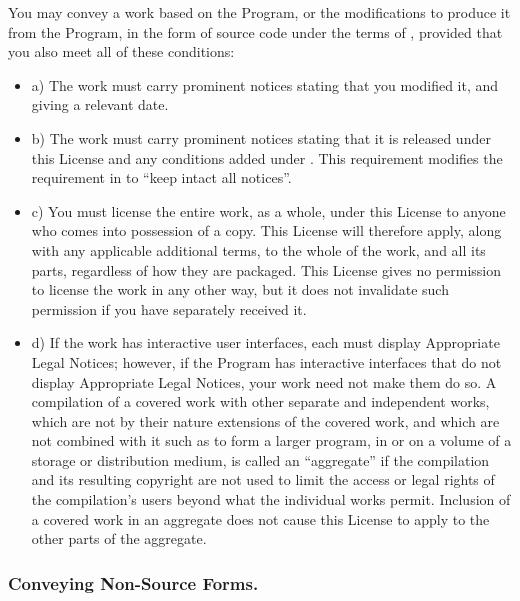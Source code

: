 \documentclass[10pt,english]{article}
\begin{document}
You may convey a work based on the Program, or the modifications to
produce it from the Program, in the form of source code under the
terms of , provided that
you also meet all of these conditions:
\begin{itemize}
\item a) The work must carry prominent notices stating that you modified
it, and giving a relevant date.
\item b) The work must carry prominent notices stating that it is released
under this License and any conditions added under .
This requirement modifies the requirement in 
to \textquotedblleft{}keep intact all notices\textquotedblright{}.
\item c) You must license the entire work, as a whole, under this License
to anyone who comes into possession of a copy. This License will therefore
apply, along with any applicable 
additional terms, to the whole of the work, and all its parts, regardless
of how they are packaged. This License gives no permission to license
the work in any other way, but it does not invalidate such permission
if you have separately received it.
\item d) If the work has interactive user interfaces, each must display
Appropriate Legal Notices; however, if the Program has interactive
interfaces that do not display Appropriate Legal Notices, your work
need not make them do so. A compilation of a covered work with other
separate and independent works, which are not by their nature extensions
of the covered work, and which are not combined with it such as to
form a larger program, in or on a volume of a storage or distribution
medium, is called an \textquotedblleft{}aggregate\textquotedblright{}
if the compilation and its resulting copyright are not used to limit
the access or legal rights of the compilation's users beyond what
the individual works permit. Inclusion of a covered work in an aggregate
does not cause this License to apply to the other parts of the aggregate.
\end{itemize}

\subsubsection{Conveying Non-Source Forms.\label{sub:Conveying-Non-Source-Forms.}}
\end{document}
